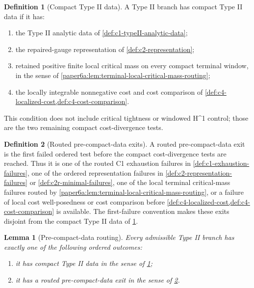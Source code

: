 \documentclass[11pt]{amsart}
\def\({}%
\def\){}%
\theoremstyle{plain}
\newtheorem{lemma}[lemma]{Lemma}
\theoremstyle{definition}
\newtheorem{definition}[definition]{Definition}
\theoremstyle{remark}
\begin{document}
\begin{definition}[Compact Type II data]
\label{def:c5-compact-typeII-data}
A Type II branch has compact Type II data if
it has:
\begin{enumerate}[label=\textup{(\roman*)}]
\item the Type II analytic data of \cref{def:c1-typeII-analytic-data};
\item the repaired-gauge representation of \cref{def:c2-representation};
\item retained positive finite local critical mass on every compact terminal
window, in the sense of \cref{paper6a:lem:terminal-local-critical-mass-routing};
\item the locally integrable nonnegative cost and cost comparison of
\cref{def:c4-localized-cost,def:c4-cost-comparison}.
\end{enumerate}
This condition does not include critical tightness or windowed \(H^1\) control;
those are the two remaining compact cost-divergence tests.
\end{definition}

\begin{definition}[Routed pre-compact-data exits]
\label{def:c5-precompact-routed-exits}
A routed pre-compact-data exit is the first failed ordered test before the
compact cost-divergence tests are reached.  Thus it is one of the routed C1
exhaustion failures in \cref{def:c1-exhaustion-failures}, one of the ordered
representation failures in \cref{def:c2-representation-failures} or
\cref{def:c2r-minimal-failures}, one of the local terminal critical-mass
failures routed by \cref{paper6a:lem:terminal-local-critical-mass-routing}, or a
failure of local cost well-posedness or cost comparison before
\cref{def:c4-localized-cost,def:c4-cost-comparison} is available.  The
first-failure convention makes these exits disjoint from the compact Type II
data of \cref{def:c5-compact-typeII-data}.
\end{definition}

\begin{lemma}[Pre-compact-data routing]
\label{lem:c5-precompact-data-routing}
Every admissible Type II branch has exactly one of the following ordered
outcomes:
\begin{enumerate}[label=\textup{(\roman*)}]
\item it has compact Type II data in the sense of
\cref{def:c5-compact-typeII-data};
\item it has a routed pre-compact-data exit in the sense of
\cref{def:c5-precompact-routed-exits}.
\end{enumerate}
\end{lemma}
\end{document}

